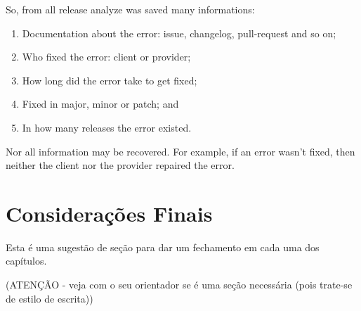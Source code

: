 So, from all release analyze was saved many informations:

\begin{enumerate}
    \item Documentation about the error: issue, changelog, pull-request and so on;
    \item Who fixed the error: client or provider;
    \item How long did the error take to get fixed;
    \item Fixed in major, minor or patch; and
    \item In how many releases the error existed.
\end{enumerate}{}

Nor all information may be recovered. For example, if an error wasn’t fixed, then neither the client nor the provider repaired the error.

\section{Considerações Finais}
\label{cap:metodologia:sec:consideracoes:finais}

Esta é uma sugestão de seção para dar um fechamento em cada uma dos capítulos.

(ATENÇÃO - veja com o seu orientador se é uma seção necessária (pois trate-se de estilo de escrita))